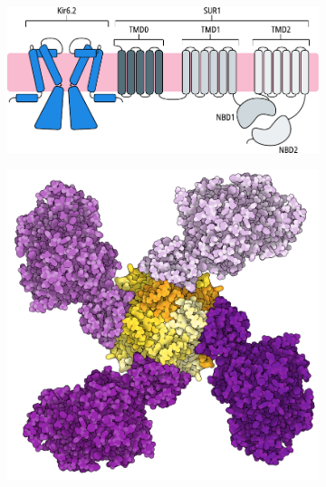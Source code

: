 \begin{figure}[hbtp]
	\centering
	\begin{subfigure}[t]{0.9\textwidth}
		\caption{}\label{ch1fig:katp_cartoon}
		\centering
		\includegraphics[width=\textwidth]{katp_cartoon.pdf}
	\end{subfigure}
	\vfill
	\begin{subfigure}[t]{0.45\textwidth}
		\caption{}\label{ch1fig:sur_topdown}
		\centering
		\includegraphics[width=\textwidth]{sur_topdown_propellor.pdf}
	\end{subfigure}
	\hfill
	\begin{subfigure}[t]{0.45\textwidth}
		\caption{}\label{ch1fig:sur_ctd}
		\centering

\end{subfigure}
\end{figure}

